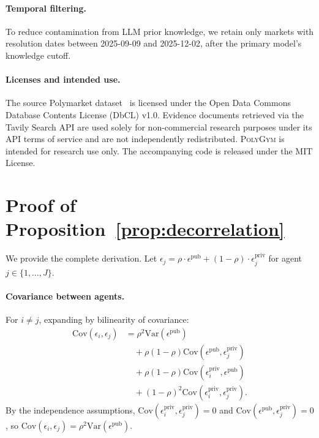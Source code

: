 \paragraph{Temporal filtering.}
To reduce contamination from LLM prior knowledge, we retain only markets with resolution dates between 2025-09-09 and 2025-12-02, after the primary model's knowledge cutoff.

\paragraph{Licenses and intended use.}
The source Polymarket dataset~\citep{kaggle_polymarket_dataset} is licensed under the Open Data Commons Database Contents License (DbCL) v1.0.
Evidence documents retrieved via the Tavily Search API are used solely for non-commercial research purposes under its API terms of service and are not independently redistributed.
\textsc{PolyGym} is intended for research use only. The accompanying code is released under the MIT License.

\section{Proof of Proposition~\ref{prop:decorrelation}}
\label{sec:appendix_proof}

We provide the complete derivation.
Let $\epsilon_j = \rho \cdot \epsilon^{\mathrm{pub}} + (1 - \rho) \cdot \epsilon_j^{\mathrm{priv}}$ for agent $j \in \{1, \dots, J\}$.

\paragraph{Covariance between agents.}
For $i \neq j$, expanding by bilinearity of covariance:
\begin{align}
\mathrm{Cov}(\epsilon_i, \epsilon_j)
  &= \rho^2 \mathrm{Var}(\epsilon^{\mathrm{pub}}) \nonumber\\
  &\quad + \rho(1{-}\rho)\mathrm{Cov}(\epsilon^{\mathrm{pub}}, \epsilon_j^{\mathrm{priv}}) \nonumber\\
  &\quad + \rho(1{-}\rho)\mathrm{Cov}(\epsilon_i^{\mathrm{priv}}, \epsilon^{\mathrm{pub}}) \nonumber\\
  &\quad + (1{-}\rho)^2\mathrm{Cov}(\epsilon_i^{\mathrm{priv}}, \epsilon_j^{\mathrm{priv}}).
\end{align}
By the independence assumptions, $\mathrm{Cov}(\epsilon_i^{\mathrm{priv}}, \epsilon_j^{\mathrm{priv}}) = 0$
and $\mathrm{Cov}(\epsilon^{\mathrm{pub}}, \epsilon_j^{\mathrm{priv}}) = 0$, so
$\mathrm{Cov}(\epsilon_i, \epsilon_j) = \rho^2 \mathrm{Var}(\epsilon^{\mathrm{pub}})$.

